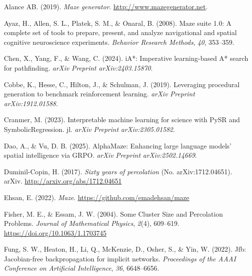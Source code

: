 \documentclass[10pt,a4paper,onecolumn]{article}
\newlength{\cslhangindent}
\newenvironment{CSLReferences}[2] %
 {\begin{list}{}{%
  \setlength{\itemindent}{0pt}
  \setlength{\leftmargin}{0pt}
  \setlength{\parsep}{0pt}
  \ifodd #1
   \setlength{\leftmargin}{\cslhangindent}
   \setlength{\itemindent}{-1\cslhangindent}
  \fi
  \setlength{\itemsep}{#2\baselineskip}}}
 {\end{list}}
\begin{document}
\hypertarget{refs}{}
\begin{CSLReferences}{1}{0.5}
\leavevmode{}%
Alance AB. (2019). \emph{Maze generator}.
\url{http://www.mazegenerator.net}.

\leavevmode{}%
Ayaz, H., Allen, S. L., Platek, S. M., \& Onaral, B. (2008). Maze suite
1.0: A complete set of tools to prepare, present, and analyze
navigational and spatial cognitive neuroscience experiments.
\emph{Behavior Research Methods}, \emph{40}, 353--359.

\leavevmode{}%
Chen, X., Yang, F., \& Wang, C. (2024). {iA*}: Imperative learning-based
{A*} search for pathfinding. \emph{arXiv Preprint arXiv:2403.15870}.

\leavevmode{}%
Cobbe, K., Hesse, C., Hilton, J., \& Schulman, J. (2019). Leveraging
procedural generation to benchmark reinforcement learning. \emph{arXiv
Preprint arXiv:1912.01588}.

\leavevmode{}%
Cranmer, M. (2023). Interpretable machine learning for science with PySR
and SymbolicRegression. jl. \emph{arXiv Preprint arXiv:2305.01582}.

\leavevmode{}%
Dao, A., \& Vu, D. B. (2025). AlphaMaze: Enhancing large language
models' spatial intelligence via GRPO. \emph{arXiv Preprint
arXiv:2502.14669}.

\leavevmode{}%
Duminil-Copin, H. (2017). \emph{Sixty years of percolation} (No.
arXiv:1712.04651). {arXiv}. \url{http://arxiv.org/abs/1712.04651}

\leavevmode{}%
Ehsan, E. (2022). \emph{Maze}. \url{https://github.com/emadehsan/maze}

\leavevmode{}%
Fisher, M. E., \& Essam, J. W. (2004). Some {Cluster Size} and
{Percolation Problems}. \emph{Journal of Mathematical Physics},
\emph{2}(4), 609--619. \url{https://doi.org/10.1063/1.1703745}

\leavevmode{}%
Fung, S. W., Heaton, H., Li, Q., McKenzie, D., Osher, S., \& Yin, W.
(2022). Jfb: Jacobian-free backpropagation for implicit networks.
\emph{Proceedings of the AAAI Conference on Artificial Intelligence},
\emph{36}, 6648--6656.


\end{CSLReferences}
\end{document}
